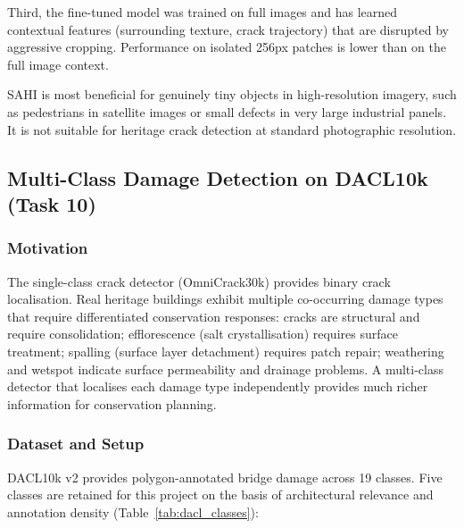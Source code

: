 \documentclass[12pt,a4paper]{article}
\begin{document}
Third, the fine-tuned model was trained on full images and has learned contextual features (surrounding texture, crack trajectory) that are disrupted by aggressive cropping. Performance on isolated 256px patches is lower than on the full image context.

SAHI is most beneficial for genuinely tiny objects in high-resolution imagery, such as pedestrians in satellite images or small defects in very large industrial panels. It is not suitable for heritage crack detection at standard photographic resolution.

\subsection{Multi-Class Damage Detection on DACL10k (Task 10)}

\subsubsection{Motivation}

The single-class crack detector (OmniCrack30k) provides binary crack localisation. Real heritage buildings exhibit multiple co-occurring damage types that require differentiated conservation responses: cracks are structural and require consolidation; efflorescence (salt crystallisation) requires surface treatment; spalling (surface layer detachment) requires patch repair; weathering and wetspot indicate surface permeability and drainage problems. A multi-class detector that localises each damage type independently provides much richer information for conservation planning.

\subsubsection{Dataset and Setup}

DACL10k v2 provides polygon-annotated bridge damage across 19 classes. Five classes are retained for this project on the basis of architectural relevance and annotation density (Table~\ref{tab:dacl_classes}):
\end{document}
